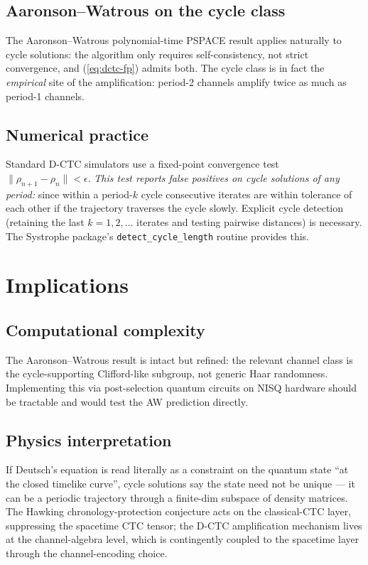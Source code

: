 \documentclass[11pt,a4paper]{article}
\begin{document}
\subsection{Aaronson--Watrous on the cycle class}

The Aaronson--Watrous polynomial-time PSPACE result
\cite{AaronsonWatrous2009} applies naturally to cycle solutions: the
algorithm only requires self-consistency, not strict convergence,
and (\ref{eq:dctc-fp}) admits both. The cycle class is in fact the
\emph{empirical} site of the amplification: period-2 channels
amplify twice as much as period-1 channels.

\subsection{Numerical practice}

Standard D-CTC simulators use a fixed-point convergence test
$\| \rho_{n+1} - \rho_n \| < \epsilon$. \emph{This test reports false
positives on cycle solutions of any period:} since within a
period-$k$ cycle consecutive iterates are within tolerance of each
other if the trajectory traverses the cycle slowly. Explicit
cycle detection (retaining the last $k = 1, 2, \ldots$ iterates
and testing pairwise distances) is necessary. The Systrophe
package's \texttt{detect\_cycle\_length} routine provides this.

\section{Implications}

\subsection{Computational complexity}

The Aaronson--Watrous result is intact but refined: the relevant
channel class is the cycle-supporting Clifford-like subgroup, not
generic Haar randomness. Implementing this via post-selection
quantum circuits on NISQ hardware should be tractable and would
test the AW prediction directly.

\subsection{Physics interpretation}

If Deutsch's equation is read literally as a constraint on the
quantum state ``at the closed timelike curve'', cycle solutions say
the state need not be unique --- it can be a periodic trajectory
through a finite-dim subspace of density matrices. The Hawking
chronology-protection conjecture \cite{Hawking1992} acts on the
classical-CTC layer, suppressing the spacetime CTC tensor; the
D-CTC amplification mechanism lives at the channel-algebra level,
which is contingently coupled to the spacetime layer through the
channel-encoding choice.
\end{document}

